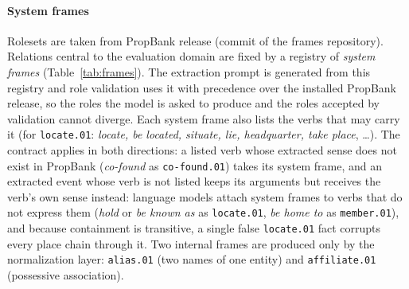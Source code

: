 \documentclass[preprint,12pt,authoryear]{elsarticle}
\begin{document}
\paragraph{System frames}
Rolesets are taken from PropBank release \ResPropBankRef{} (commit \ResPropBankCommit{} of the frames repository).
Relations central to the evaluation domain are fixed by a registry of \emph{system frames} (Table~\ref{tab:frames}).
The extraction prompt is generated from this registry and role validation uses it with precedence over the installed PropBank release, so the roles the model is asked to produce and the roles accepted by validation cannot diverge.
Each system frame also lists the verbs that may carry it (for \texttt{locate.01}: \textit{locate, be located, situate, lie, headquarter, take place}, \ldots).
The contract applies in both directions: a listed verb whose extracted sense does not exist in PropBank (\textit{co-found} as \texttt{co-found.01}) takes its system frame, and an extracted event whose verb is not listed keeps its arguments but receives the verb's own sense instead: language models attach system frames to verbs that do not express them (\textit{hold} or \textit{be known as} as \texttt{locate.01}, \textit{be home to} as \texttt{member.01}), and because containment is transitive, a single false \texttt{locate.01} fact corrupts every place chain through it.
Two internal frames are produced only by the normalization layer: \texttt{alias.01} (two names of one entity) and \texttt{affiliate.01} (possessive association).
\end{document}
